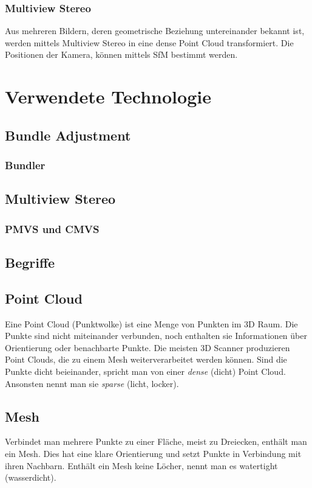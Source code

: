 \documentclass{paper}
\begin{document}
		\subsubsection{Multiview Stereo}
			Aus mehreren Bildern, deren geometrische Beziehung untereinander bekannt ist, werden mittels Multiview Stereo in eine dense Point Cloud transformiert. Die Positionen der Kamera, können mittels SfM bestimmt werden.
			
	\section{Verwendete Technologie} \label{tech}
		\subsection{Bundle Adjustment}
		
			\subsubsection{Bundler}
			
		\subsection{Multiview Stereo}
			\subsubsection{PMVS und CMVS}
			
		
			
				

	
	\begin{appendix}
		\section{Begriffe}
			\subsection{Point Cloud}\label{app:point_cloud}
				Eine Point Cloud (Punktwolke) ist eine Menge von Punkten im 3D Raum. Die Punkte sind nicht miteinander verbunden, noch enthalten sie Informationen über Orientierung oder benachbarte Punkte. Die meisten 3D Scanner produzieren Point Clouds, die zu einem Mesh weiterverarbeitet werden können.
				Sind die Punkte dicht beieinander, spricht man von einer \emph{dense} (dicht) Point Cloud. Ansonsten nennt man sie \emph{sparse} (licht, locker).
			
			\subsection{Mesh}\label{app:mesh}
				Verbindet man mehrere Punkte zu einer Fläche, meist zu Dreiecken, enthält man ein Mesh. Dies hat eine klare Orientierung und setzt Punkte in Verbindung mit ihren Nachbarn. Enthält ein Mesh keine Löcher, nennt man es watertight (wasserdicht).
			
	\end{appendix}
	
	\listoffigures
	
%	
	
%	
	\nocite{*}
	
\end{document}
